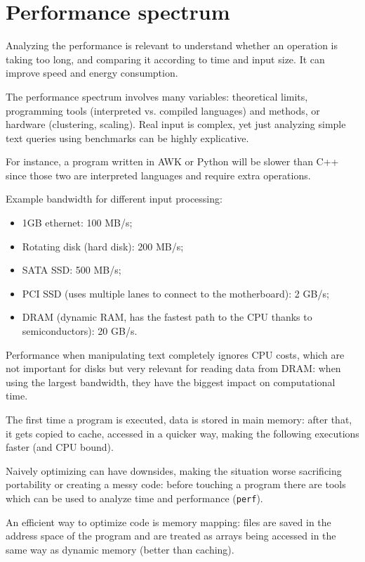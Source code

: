 \section{Performance spectrum}
Analyzing the performance is relevant to understand whether an operation is taking too long, and comparing it according to time and input size. It can improve speed and energy consumption.

The performance spectrum involves many variables: theoretical limits, programming tools (interpreted vs. compiled languages) and methods, or hardware (clustering, scaling). Real input is complex, yet just analyzing simple text queries using benchmarks can be highly explicative.

For instance, a program written in AWK or Python will be slower than C++ since those two are interpreted languages and require extra operations.

Example bandwidth for different input processing:
\begin{itemize}
	\item 1GB ethernet: 100 MB/s;
	\item Rotating disk (hard disk): 200 MB/s;
	\item SATA SSD: 500 MB/s;
	\item PCI SSD (uses multiple lanes to connect to the motherboard): 2 GB/s;
	\item DRAM (dynamic RAM, has the fastest path to the CPU thanks to semiconductors): 20 GB/s.
\end{itemize}

Performance when manipulating text completely ignores CPU costs, which are not important for disks but very relevant for reading data from DRAM: when using the largest bandwidth, they have the biggest impact on computational time.

The first time a program is executed, data is stored in main memory: after that, it gets copied to cache, accessed in a quicker way, making the following executions faster (and CPU bound).

Naively optimizing can have downsides, making the situation worse sacrificing portability or creating a messy code: before touching a program there are tools which can be used to analyze time and performance (\texttt{perf}).

An efficient way to optimize code is memory mapping: files are saved in the address space of the program and are treated as arrays being accessed in the same way as dynamic memory (better than caching).

